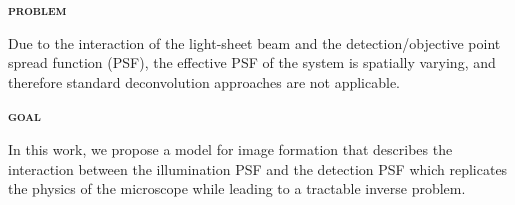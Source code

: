\documentclass[a0paper,portrait,fontscale=0.35]{baposter}
\theoremstyle{plain}
\theoremstyle{plain}
\theoremstyle{definition}
\theoremstyle{plain}
\theoremstyle{definition}
\begin{document}
\begin{poster}
{  \begin{minipage}[t]{0.48\textwidth}
    \begin{center}
      \larger
      {\color{red}\textbf{\textsc{problem}}}\\
    \end{center}
    \vspace{-1em}
    \begin{tcolorbox}[colback=red!10!white,colframe=red]
      Due to the interaction of the light-sheet beam  
      and the detection/objective point spread function (PSF), 
      the effective PSF of the system is spatially varying, and
      therefore standard deconvolution approaches are not applicable.
    \end{tcolorbox}
  \end{minipage}
  \hspace{0.6em}
  \begin{minipage}[t]{0.48\textwidth}
    \begin{center}
      \larger
      {\color{blue}\textbf{\textsc{goal}}}\\
    \end{center}
    \vspace{-1em}
    \begin{tcolorbox}[colback=blue!10!white,colframe=blue]
      In this work, we propose a model for image formation 
      that describes the interaction between the 
      illumination PSF and the detection PSF which 
      replicates the physics of the microscope while 
      leading to a tractable inverse problem.
    \end{tcolorbox}
  \end{minipage}
  \vspace{-1em}
}
\end{poster}
\end{document}
